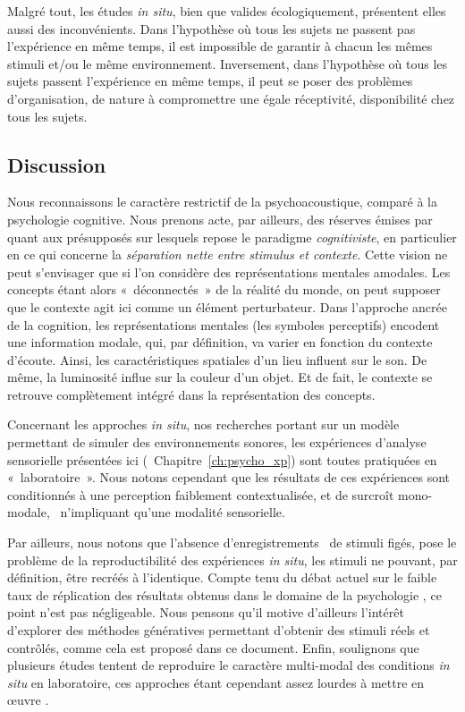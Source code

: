 Malgré tout, les études \emph{in situ}, bien que valides écologiquement, présentent elles aussi des inconvénients. Dans l'hypothèse où tous les sujets ne passent pas l'expérience en même temps, il est impossible de garantir à chacun les mêmes stimuli et/ou le même environnement. Inversement, dans l'hypothèse où tous les sujets passent l'expérience en même temps, il peut se poser des problèmes d'organisation, de nature à compromettre une égale réceptivité, disponibilité chez tous les sujets.

\subsection{Discussion}

Nous reconnaissons le caractère restrictif de la psychoacoustique, comparé à la psychologie cognitive. Nous prenons acte, par ailleurs, des réserves émises par \cite{maffiolo_caracterisation_1999} quant aux présupposés sur lesquels repose le paradigme \emph{cognitiviste}, en particulier en ce qui concerne la \emph{séparation nette entre stimulus et contexte}. Cette vision ne peut s'envisager que si l'on considère des représentations mentales amodales. Les concepts étant alors «~déconnectés~» de la réalité du monde, on peut supposer que le contexte agit ici comme un élément perturbateur. Dans l'approche ancrée de la cognition, les représentations mentales (les symboles perceptifs) encodent une information modale, qui, par définition, va varier en fonction du contexte d'écoute. Ainsi, les caractéristiques spatiales d'un lieu influent sur le son. De même, la luminosité influe sur la couleur d'un objet. Et de fait, le contexte se retrouve complètement intégré dans la représentation des concepts.

Concernant les approches \emph{in situ}, nos recherches portant sur un modèle permettant de simuler des environnements sonores, les expériences d'analyse sensorielle présentées ici (\cf~Chapitre~\ref{ch:psycho_xp}) sont toutes pratiquées en «~laboratoire~». Nous notons cependant que les résultats de ces expériences sont conditionnés à une perception faiblement contextualisée, et de surcroît mono-modale, \ie~n'impliquant qu'une modalité sensorielle.

Par ailleurs, nous notons que l'absence d'enregistrements \ie~de stimuli figés, pose le problème de la reproductibilité des expériences \emph{in situ}, les stimuli ne pouvant, par définition, être recréés à l'identique. Compte tenu du débat actuel sur le faible taux de réplication des résultats obtenus dans le domaine de la psychologie \citep{spellman2015short}, ce point n'est pas négligeable. Nous pensons qu'il motive d'ailleurs l'intérêt d'explorer des méthodes génératives permettant d'obtenir des stimuli réels et contrôlés, comme cela est proposé dans ce document. Enfin, soulignons que plusieurs études tentent de reproduire le caractère multi-modal des conditions \emph{in situ} en laboratoire, ces approches étant cependant assez lourdes à mettre en œuvre \citep{woloszyn1997vers,morel2016noise}.

